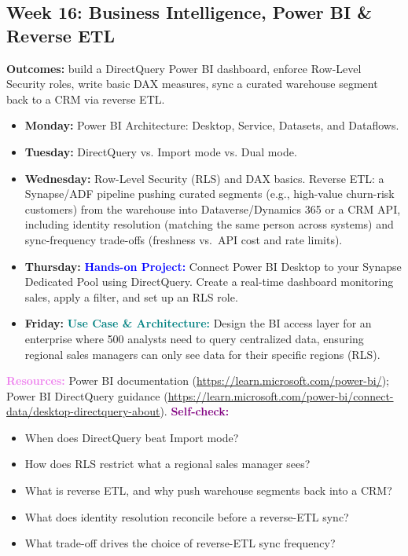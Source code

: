\documentclass[11pt, a4paper]{article}
\newcommand{\project}[1]{\vspace{1mm}\noindent\textbf{\textcolor{blue}{Hands-on Project:}} #1}
\newcommand{\usecase}[1]{\vspace{1mm}\noindent\textbf{\textcolor{teal}{Use Case \& Architecture:}} #1}
\newcommand{\dayitem}[2]{\item \textbf{#1:} #2}
\newcommand{\resources}[1]{\vspace{1mm}\noindent\textbf{\textcolor{violet}{Resources:}} #1}
\newcommand{\selfcheck}[1]{\vspace{1mm}\noindent\textbf{\textcolor{purple}{Self-check:}} #1}
\begin{document}
\subsection*{Week 16: Business Intelligence, Power BI \& Reverse ETL}
\par\noindent\textbf{Outcomes:} build a DirectQuery Power BI dashboard, enforce Row-Level Security roles, write basic DAX measures, sync a curated warehouse segment back to a CRM via reverse ETL.
\begin{itemize}[label=-]
    \dayitem{Monday}{Power BI Architecture: Desktop, Service, Datasets, and Dataflows.}
    \dayitem{Tuesday}{DirectQuery vs. Import mode vs. Dual mode.}
    \dayitem{Wednesday}{Row-Level Security (RLS) and DAX basics. Reverse ETL: a Synapse/ADF pipeline pushing curated segments (e.g., high-value churn-risk customers) from the warehouse into Dataverse/Dynamics 365 or a CRM API, including identity resolution (matching the same person across systems) and sync-frequency trade-offs (freshness vs.\ API cost and rate limits).}
    \dayitem{Thursday}{\project{Connect Power BI Desktop to your Synapse Dedicated Pool using DirectQuery. Create a real-time dashboard monitoring sales, apply a filter, and set up an RLS role.}}
    \dayitem{Friday}{\usecase{Design the BI access layer for an enterprise where 500 analysts need to query centralized data, ensuring regional sales managers can only see data for their specific regions (RLS).}}
\end{itemize}
\resources{Power BI documentation (\url{https://learn.microsoft.com/power-bi/}); Power BI DirectQuery guidance (\url{https://learn.microsoft.com/power-bi/connect-data/desktop-directquery-about}).}
\selfcheck{\begin{itemize}[label=-, itemsep=0pt]
    \item When does DirectQuery beat Import mode?
    \item How does RLS restrict what a regional sales manager sees?
    \item What is reverse ETL, and why push warehouse segments back into a CRM?
    \item What does identity resolution reconcile before a reverse-ETL sync?
    \item What trade-off drives the choice of reverse-ETL sync frequency?
\end{itemize}}
\end{document}
